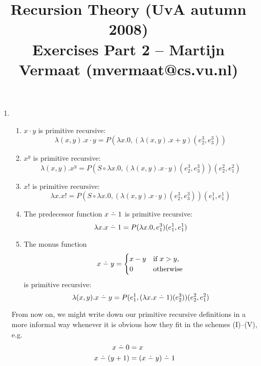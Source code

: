 \documentclass[a4paper,11pt]{article}
\title{Recursion Theory (UvA autumn 2008)\\
\normalsize{Exercises Part 2 -- Martijn Vermaat (mvermaat@cs.vu.nl)}}
\date{}
\newcommand{\dotmin}{\buildrel\textstyle.\over{\hbox{\vrule height3pt depth0pt width0pt}{\smash-}}}
\begin{document}
\maketitle


\begin{enumerate}


\item %
\begin{enumerate}
\item $x \cdot y$ is primitive recursive:
\begin{equation*}
  \lambda (x, y). x \cdot y = P(\lambda x.0,
                                (\lambda (x, y). x + y) (e^3_2, e^3_3))
\end{equation*}

\item $x^y$ is primitive recursive:
\begin{equation*}
  \lambda (x, y). x^y = P(S \circ \lambda x.0,
                          (\lambda (x, y). x \cdot y) (e^3_2, e^3_3)) (e^2_2, e^2_1)
\end{equation*}

\item $x!$ is primitive recursive:
\begin{equation*}
  \lambda x.x! = P(S \circ \lambda x.0,
                   (\lambda (x, y). x \cdot y) (e^3_2, e^3_3)) (e^1_1, e^1_1)
\end{equation*}

\item The predecessor function $x \dotmin 1$ is primitive recursive:
\begin{equation*}
  \lambda x.x \dotmin 1 = P(\lambda x.0,
                            e^3_1) (e^1_1, e^1_1)
\end{equation*}

\item The monus function
\begin{equation*}
  x \dotmin y =
  \begin{cases}
    x - y & \text{if $x > y$,}\\
    0     & \text{otherwise}
  \end{cases}
\end{equation*}
is primitive recursive:
\begin{equation*}
  \lambda (x, y).x \dotmin y = P(e^1_1, (\lambda x.x \dotmin 1) (e^3_2)) (e^2_2, e^2_1)
\end{equation*}
\end{enumerate}

From now on, we might write down our primitive recursive definitions in a more
informal way whenever it is obvious how they fit in the schemes (I)--(V), e.g.
\begin{align*}
  x \dotmin 0       &= x\\
  x \dotmin (y + 1) &= (x \dotmin y) \dotmin 1
\end{align*}


\end{enumerate}
\end{document}
